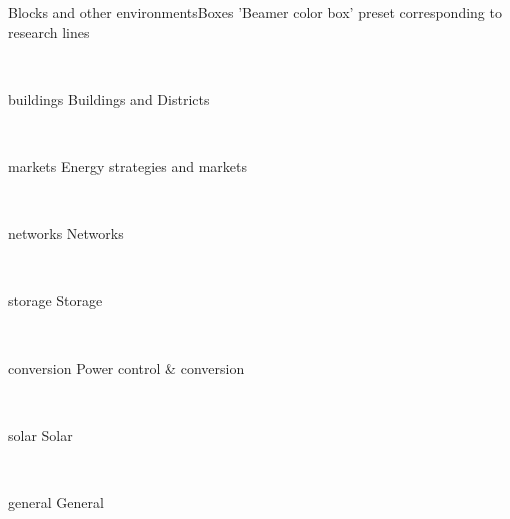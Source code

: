 \documentclass[aspectratio=169, 11pt]{beamer}
\begin{document}
\begin{frame}{Blocks and other environments}{Boxes}
'Beamer color box' preset corresponding to research lines
	\begin{center}~
		\begin{beamercolorbox}[wd=.7\textwidth,sep=4pt,center]{buildings}
            Buildings and Districts
		\end{beamercolorbox}
	\end{center}
	
	\begin{center}~
		\begin{beamercolorbox}[wd=.7\textwidth,sep=4pt,center]{markets}
            Energy strategies and markets
		\end{beamercolorbox}
	\end{center}

	\begin{center}~
		\begin{beamercolorbox}[wd=.7\textwidth,sep=4pt,center]{networks}
            Networks
		\end{beamercolorbox}
	\end{center}

	\begin{center}~
		\begin{beamercolorbox}[wd=.7\textwidth,sep=4pt,center]{storage}
            Storage
		\end{beamercolorbox}
	\end{center}

	\begin{center}~
		\begin{beamercolorbox}[wd=.7\textwidth,sep=4pt,center]{conversion}
            Power control \& conversion
		\end{beamercolorbox}
	\end{center}

	\begin{center}~
		\begin{beamercolorbox}[wd=.7\textwidth,sep=4pt,center]{solar}
            Solar
		\end{beamercolorbox}
	\end{center}

	\begin{center}~
		\begin{beamercolorbox}[wd=.7\textwidth,sep=4pt,center]{general}
            General
		\end{beamercolorbox}
	\end{center}
\end{frame}
\end{document}
